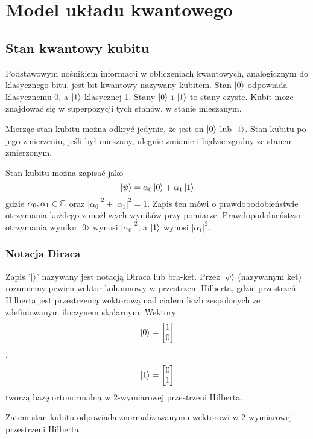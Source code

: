 \chapter{Model układu kwantowego}
\thispagestyle{chapterBeginStyle}
\label{rozdzial0b}

\section{Stan kwantowy kubitu}
Podstawowym nośnikiem informacji w obliczeniach kwantowych, analogicznym do klasycznego bitu, jest bit kwantowy nazywany kubitem. Stan $\ket{0}$ odpowiada klasycznemu 0, a $\ket{1}$ klasycznej 1. Stany $\ket{0}$ i $\ket{1}$ to stany czyste. Kubit może znajdować się w superpozycji tych stanów, w stanie mieszanym. 
\par Mierząc stan kubitu można odkryć jedynie, że jest on $\ket{0}$ lub $\ket{1}$. Stan kubitu po jego zmierzeniu, jeśli był mieszany, ulegnie zmianie i będzie zgodny ze stanem zmierzonym.
\par Stan kubitu można zapisać jako
\[\ket{\psi} = \alpha_0\ket{0} + \alpha_1\ket{1}\]
gdzie $\alpha_0, \alpha_1 \in \mathbb{C}$ oraz $\left|\alpha_0\right|^2 + \left|\alpha_1\right|^2 = 1$. Zapis ten mówi o prawdobodobieństwie otrzymania każdego z możliwych wyników przy pomiarze. Prawdopodobieństwo otrzymania wyniku $\ket{0}$ wynosi $\left|\alpha_0\right|^2$, a $\ket{1}$ wynosi $\left|\alpha_1\right|^2$.
\subsection{Notacja Diraca}
Zapis '$\ket{}$' nazywany jest notacją Diraca lub bra-ket. 
Przez $\ket{\psi}$ (nazywanym ket) rozumiemy pewien wektor kolumnowy w przestrzeni Hilberta, gdzie przestrzeń Hilberta jest przestrzenią wektorową nad ciałem liczb zespolonych ze zdefiniowanym iloczynem skalarnym.
Wektory 
\[
    \ket{0}
    =
    \begin{bmatrix}
        1 \\
        0 \\
    \end{bmatrix}
\], 
\[
    \ket{1}
    =
    \begin{bmatrix}
        0 \\
        1 \\
    \end{bmatrix}
\] tworzą bazę ortonormalną w 2-wymiarowej przestrzeni Hilberta.
\par Zatem stan kubitu odpowiada znormalizowanymu wektorowi w 2-wymiarowej przestrzeni Hilberta.
